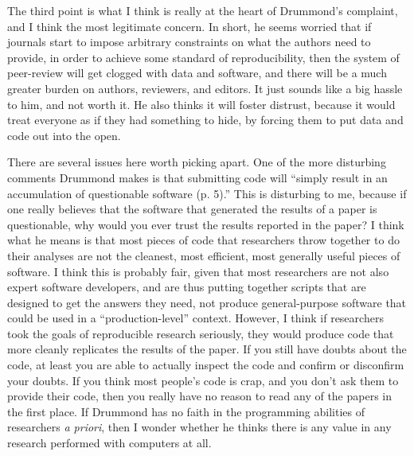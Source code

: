 \documentclass{book}
\begin{document}
The third point is what I think is really at the heart of Drummond's complaint, and I think the most legitimate concern. In short, he seems worried that if journals start to impose arbitrary constraints on what the authors need to provide, in order to achieve some standard of reproducibility, then the system of peer-review will get clogged with data and software, and there will be a much greater burden on authors, reviewers, and editors. It just sounds like a big hassle to him, and not worth it. He also thinks it will foster distrust, because it would treat everyone as if they had something to hide, by forcing them to put data and code out into the open. 

There are several issues here worth picking apart.  One of the more disturbing comments Drummond makes is that submitting code will ``simply result in an accumulation of questionable software (p. 5).'' This is disturbing to me, because if one really believes that the software that generated the results of a paper is questionable, why would you ever trust the results reported in the paper?  I think what he means is that most pieces of code that researchers throw together to do their analyses are not the cleanest, most efficient, most generally useful pieces of software.  I think this is probably fair, given that most researchers are not also expert software developers, and are thus putting together scripts that are designed to get the answers they need, not produce general-purpose software that could be used in a ``production-level'' context. However, I think if researchers took the goals of reproducible research seriously, they would produce code that more cleanly replicates the results of the paper.  If you still have doubts about the code, at least you are able to actually inspect the code and confirm or disconfirm your doubts. If you think most people's code is crap, and you don't ask them to provide their code, then you really have no reason to read any of the papers in the first place. If Drummond has no faith in the programming abilities of researchers \emph{a priori}, then I wonder whether he thinks there is any value in any research performed with computers at all.
\end{document}
